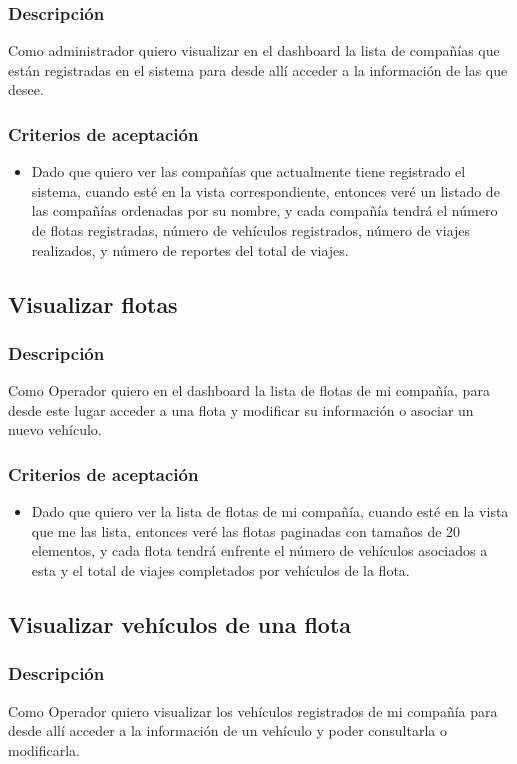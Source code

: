 \documentclass{article}
\begin{document}
\subsubsection{Descripción}
Como administrador quiero visualizar en el dashboard la lista de compañías que están registradas en el sistema para desde allí acceder a la información de las que desee.
\subsubsection{Criterios de aceptación}
\begin{itemize}
    \item Dado que quiero ver las compañías que actualmente tiene registrado el sistema, cuando esté en la vista correspondiente, entonces veré un listado de las compañías ordenadas por su nombre, y cada compañía tendrá el número de flotas registradas, número de vehículos registrados, número de viajes realizados, y número de reportes del total de viajes.
\end{itemize}

\subsection{Visualizar flotas}
\subsubsection{Descripción}
Como Operador quiero en el dashboard la lista de flotas de mi compañía, para desde este lugar acceder a una flota y modificar su información o asociar un nuevo vehículo.
\subsubsection{Criterios de aceptación}
\begin{itemize}
    \item Dado que quiero ver la lista de flotas de mi compañía, cuando esté en la vista que me las lista, entonces veré las flotas paginadas con tamaños de 20 elementos, y cada flota tendrá enfrente el número de vehículos asociados a esta y el total de viajes completados por vehículos de la flota. 
\end{itemize}

\subsection{Visualizar vehículos de una flota}
\subsubsection{Descripción}
Como Operador quiero visualizar los vehículos registrados de mi compañía para desde allí acceder a la información de un vehículo y poder consultarla o modificarla.
\end{document}
